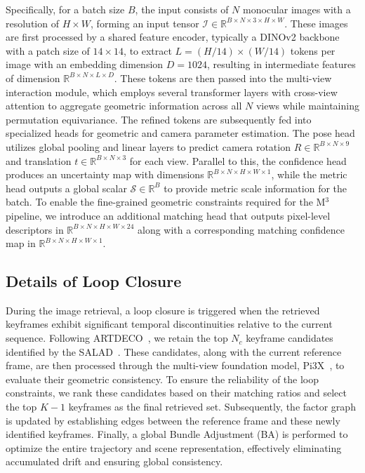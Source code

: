 Specifically, for a batch size $B$, the input consists of $N$ monocular images with a resolution of $H \times W$, forming an input tensor $\mathcal{I} \in \mathbb{R}^{B \times N \times 3 \times H \times W}$. These images are first processed by a shared feature encoder, typically a DINOv2 backbone with a patch size of $14 \times 14$, to extract $L = (H/14) \times (W/14)$ tokens per image with an embedding dimension $D=1024$, resulting in intermediate features of dimension $\mathbb{R}^{B \times N \times L \times D}$. These tokens are then passed into the multi-view interaction module, which employs several transformer layers with cross-view attention to aggregate geometric information across all $N$ views while maintaining permutation equivariance. The refined tokens are subsequently fed into specialized heads for geometric and camera parameter estimation. The pose head utilizes global pooling and linear layers to predict camera rotation $R \in \mathbb{R}^{B \times N \times 9}$ and translation $t \in \mathbb{R}^{B \times N \times 3}$ for each view. Parallel to this, the confidence head produces an uncertainty map with dimensions $\mathbb{R}^{B \times N \times H \times W \times 1}$, while the metric head outputs a global scalar $\mathcal{S} \in \mathbb{R}^{B}$ to provide metric scale information for the batch. To enable the fine-grained geometric constraints required for the M$^3$ pipeline, we introduce an additional matching head that outputs pixel-level descriptors in $\mathbb{R}^{B \times N \times H \times W \times 24}$ along with a corresponding matching confidence map in $\mathbb{R}^{B \times N \times H \times W \times 1}$.

\subsection{Details of Loop Closure}
\label{sec:sliding_window}

During the image retrieval, a loop closure is triggered when the retrieved keyframes exhibit significant temporal discontinuities relative to the current sequence. Following ARTDECO~\cite{artdeco}, we retain the top $N_c$ keyframe candidates identified by the SALAD~\cite{izquierdo2024optimal}. These candidates, along with the current reference frame, are then processed through the multi-view foundation model, Pi3X~\cite{wang2025pi}, to evaluate their geometric consistency. To ensure the reliability of the loop constraints, we rank these candidates based on their matching ratios and select the top $K-1$ keyframes as the final retrieved set. Subsequently, the factor graph is updated by establishing edges between the reference frame and these newly identified keyframes. Finally, a global Bundle Adjustment (BA) is performed to optimize the entire trajectory and scene representation, effectively eliminating accumulated drift and ensuring global consistency.

